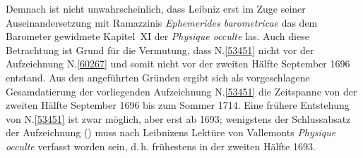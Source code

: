 Demnach ist nicht unwahrscheinlich, dass Leibniz erst im Zuge seiner Auseinandersetzung mit Ramazzinis \textit{Ephemerides barometricae}\cite{01516}\cite{01517} das dem Barometer gewidmete Kapitel~XI der \textit{Physique occulte}\cite{01513} las.
Auch diese Betrachtung ist Grund für die Vermutung, dass N.\;\ref{53451} nicht vor der Aufzeichnung N.\;\ref{60267} und somit nicht vor der zweiten Hälfte September 1696 entstand.
\pend%
\pstart%
Aus den angeführten Gründen ergibt sich als vorgeschlagene Gesamdatierung der vorliegenden Aufzeichnung N.\;\ref{53451} die Zeitspanne von der zweiten Hälfte September 1696 bis zum Sommer 1714.
Eine frühere Entstehung von N.\;\ref{53451} ist zwar möglich, aber erst ab 1693;
wenigstens der Schlussabsatz der Aufzeichnung () muss nach Leibnizens Lektüre von Vallemonts \textit{Physique occulte}\cite{01513} verfasst worden sein, d.\,h. frühestens in der zweiten Hälfte 1693.

\pend%
%
\frenchspacing%
\normalsize%
\newpage%
